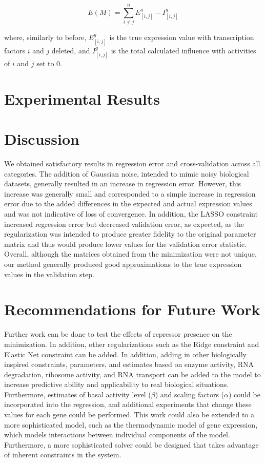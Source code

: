 \documentclass[paper=a4, fontsize=11pt]{scrartcl} %
\begin{document}
\[ E(M) = \sum_{i \neq j}^{n}{E^g_{[i,j]} - I_{[i,j]}^g} \]

where, similarly to before, $E^g_{[i,j]}$ is the true expression value with transcription factors $i$ and $j$ deleted, and $I_{[i,j]}^g$ is the total calculated influence with activities of $i$ and $j$ set to 0.

\section{Experimental Results}

\section{Discussion}
We obtained satisfactory results in regression error and cross-validation across all categories. The addition of Gaussian noise, intended to mimic noisy biological datasets, generally resulted in an increase in regression error. However, this increase was generally small and corresponded to a simple increase in regression error due to the added differences in the expected and actual expression values and was not indicative of loss of convergence. In addition, the LASSO constraint increased regression error but decreased validation error, as expected, as the regularization was intended to produce greater fidelity to the original parameter matrix and thus would produce lower values for the validation error statistic. Overall, although the matrices obtained from the minimization were not unique, our method generally produced good approximations to the true expression values in the validation step.


\section{Recommendations for Future Work}
Further work can be done to test the effects of repressor presence on the minimization. In addition, other regularizations such as the Ridge constraint and Elastic Net constraint can be added. In addition, adding in other biologically inspired constraints, parameters, and estimates based on enzyme activity, RNA degradation, ribosome activity, and RNA transport can be added to the model to increase predictive ability and applicability to real biological situations. Furthermore, estimates of basal activity level ($\beta$) and scaling factors ($\alpha$) could be incorporated into the regression, and additional experiments that change these values for each gene could be performed. This work could also be extended to a more sophisticated model, such as the thermodynamic model of gene expression, which models interactions between individual components of the model. Furthermore, a more sophisticated solver could be designed that takes advantage of inherent constraints in the system.
\end{document}
